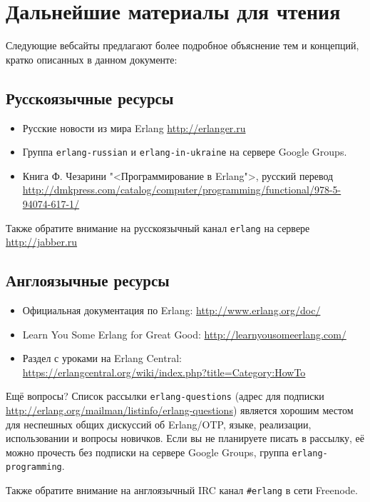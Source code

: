 \chapter{Дальнейшие материалы для чтения}

Следующие вебсайты предлагают более подробное объяснение тем и концепций, кратко
описанных в данном документе:

\section{Русскоязычные ресурсы}

\begin{itemize}
\item Русские новости из мира Erlang \url{http://erlanger.ru}
\item Группа \texttt{erlang-russian} и \texttt{erlang-in-ukraine} на сервере 
Google Groups.
\item Книга Ф. Чезарини "<Программирование в Erlang">, русский перевод
\url{http://dmkpress.com/catalog/computer/programming/functional/978-5-94074-617-1/}
\end{itemize}

Также обратите внимание на русскоязычный канал \texttt{erlang} на сервере 
\url{http://jabber.ru}

\section{Англоязычные ресурсы}

\begin{itemize}
\item Официальная документация по Erlang: \url{http://www.erlang.org/doc/}
\item Learn You Some Erlang for Great Good: \url{http://learnyousomeerlang.com/}
\item Раздел с уроками на Erlang Central: 
	\url{https://erlangcentral.org/wiki/index.php?title=Category:HowTo}
\end{itemize}

Ещё вопросы? Список рассылки \texttt{erlang-questions} (адрес для подписки
\url{http://erlang.org/mailman/listinfo/erlang-questions}) является хорошим местом
для неспешных общих дискуссий об Erlang/OTP, языке, реализации, использовании и
вопросы новичков. Если вы не планируете писать в рассылку, её можно прочесть без 
подписки на сервере Google Groups, группа \texttt{erlang-programming}.

Также обратите внимание на англоязычный IRC канал \texttt{\#erlang} в сети Freenode.
